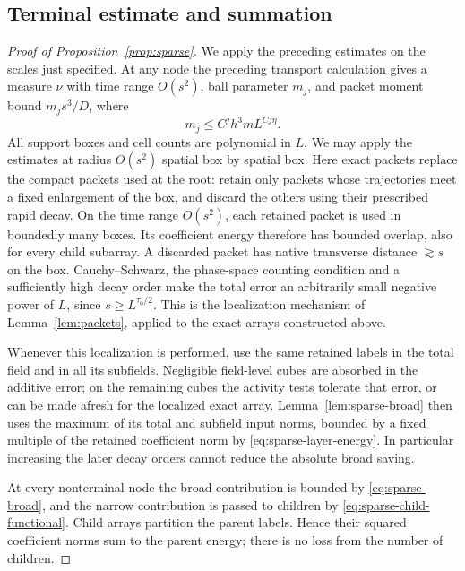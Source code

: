 \subsection{Terminal estimate and summation}

\begin{proof}[Proof of Proposition~\ref{prop:sparse}]
We apply the preceding estimates on the scales just specified.
At any node the preceding transport calculation gives a measure $\nu$
with time range $O(s^2)$, ball parameter $m_j$, and packet moment bound
$m_js^3/D$, where
\begin{equation}\label{eq:sparse-node-parameters}
 m_j\le C^j h^3m L^{Cj\eta}.
\end{equation}
All support boxes and cell counts are polynomial in $L$.  We may apply
the estimates at radius $O(s^2)$ spatial box by spatial box.  Here exact
packets replace the compact packets used at the root: retain only
packets whose trajectories meet a fixed enlargement of the box, and
discard the others using their prescribed rapid decay.  On the time
range $O(s^2)$, each retained packet is used in boundedly many boxes.
Its coefficient energy therefore has bounded overlap, also for every
child subarray.  A discarded packet has native transverse distance
$\gtrsim s$ on the box.  Cauchy--Schwarz, the phase-space counting
condition and a sufficiently high decay order make the total error an
arbitrarily small negative power of $L$, since
$s\ge L^{\tau_0/2}$.  This is the localization mechanism of
Lemma~\ref{lem:packets}, applied to the exact arrays constructed above.

Whenever this localization is performed, use the same retained labels
in the total field and in all its subfields.  Negligible field-level
cubes are absorbed in the additive error; on the remaining cubes the
activity tests tolerate that error, or can be made afresh for the
localized exact array.  Lemma~\ref{lem:sparse-broad} then uses the
maximum of its total and subfield input norms, bounded by a fixed
multiple of the retained coefficient norm by
\eqref{eq:sparse-layer-energy}.  In particular increasing the later
decay orders cannot reduce the absolute broad saving.

At every nonterminal node the broad contribution is bounded by
\eqref{eq:sparse-broad}, and the narrow contribution is passed to
children by \eqref{eq:sparse-child-functional}.  Child arrays partition
the parent labels.  Hence their squared coefficient norms sum to the
parent energy; there is no loss from the number of children.


\end{proof}
